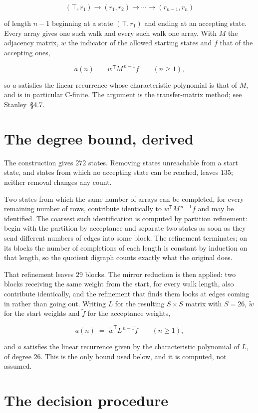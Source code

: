 \documentclass[11pt]{article}
\theoremstyle{definition}
\begin{document}
\[(\top,r_1) \to (r_1,r_2) \to \cdots \to (r_{n-1},r_n)\]

of length $n-1$ beginning at a state $(\top,r_1)$ and ending at an accepting state. Every array gives one such walk and every such walk one array. With $M$ the adjacency matrix, $w$ the indicator of the allowed starting states and $f$ that of the accepting ones,

\[a(n) \;=\; w^{\mathsf T} M^{\,n-1} f \qquad (n \ge 1),\]

so $a$ satisfies the linear recurrence whose characteristic polynomial is that of $M$, and is in particular C-finite. The argument is the transfer-matrix method; see Stanley~\S4.7.

\section{The degree bound, derived}

The construction gives $272$ states. Removing states unreachable from a start state, and states from which no accepting state can be reached, leaves $135$; neither removal changes any count.

Two states from which the same number of arrays can be completed, for every remaining number of rows, contribute identically to $w^{\mathsf T}M^{\,n-1}f$ and may be identified. The coarsest such identification is computed by partition refinement: begin with the partition by acceptance and separate two states as soon as they send different numbers of edges into some block. The refinement terminates; on its blocks the number of completions of each length is constant by induction on that length, so the quotient digraph counts exactly what the original does.

That refinement leaves $29$ blocks. The mirror reduction is then applied: two blocks receiving the same weight from the start, for every walk length, also contribute identically, and the refinement that finds them looks at edges coming in rather than going out. Writing $L$ for the resulting $S \times S$ matrix with $S = 26$, $\tilde w$ for the start weights and $\tilde f$ for the acceptance weights,

\[a(n) \;=\; \tilde w^{\mathsf T} L^{\,n-1} \tilde f \qquad (n \ge 1),\]

and $a$ satisfies the linear recurrence given by the characteristic polynomial of $L$, of degree $26$. This is the only bound used below, and it is computed, not assumed.

\section{The decision procedure}
\end{document}
